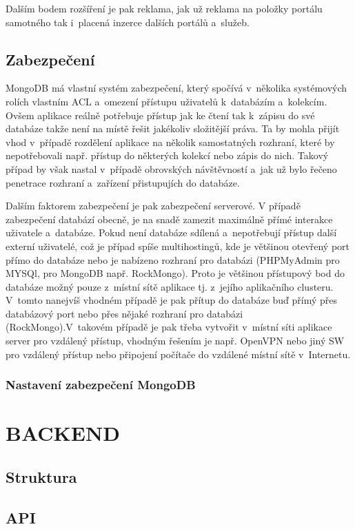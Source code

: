 \documentclass[a4paper,12pt,twoside,BCOR=10mm]{article}
\newcommand{\upc}[1]{\uppercase{#1}} %
\begin{document}
Dalším bodem rozšíření je pak reklama, jak už reklama na položky portálu samotného tak i~placená inzerce dalších portálů a~služeb.

\subsection{Zabezpečení}
MongoDB má vlastní systém zabezpečení, který spočívá v~několika systémových rolích vlastním ACL a~omezení přístupu uživatelů k~databázím a~kolekcím. Ovšem aplikace reálně potřebuje přístup jak ke čtení tak k~zápisu do své databáze takže není na místě řešit jakékoliv složitější práva. Ta by mohla přijít vhod v~případě rozdělení aplikace na několik samostatných rozhraní, které by nepotřebovali např. přístup do některých kolekcí nebo zápis do nich. Takový případ by však nastal v~případě obrovských návštěvností a~jak už bylo řečeno penetrace rozhraní a~zařízení přistupujích do databáze.

Dalším faktorem zabezpečení je pak zabezpečení serverové. V případě zabezpečení databází obecně, je na snadě zamezit maximálně přímé interakce uživatele a~databáze. Pokud není databáze sdílená a~nepotřebují přístup další externí uživatelé, což je případ spíše multihostingů, kde je většinou otevřený port přímo do databáze nebo je nabízeno rozhraní pro databázi (PHPMyAdmin pro MYSQl, pro MongoDB např. RockMongo). Proto je většinou přístupový bod do databáze možný pouze z~místní sítě aplikace tj. z~jejího aplikačního clusteru. V~tomto nanejvíš vhodném případě je pak přítup do databáze buď přímý přes databázový port nebo přes nějaké rozhraní pro databázi (RockMongo).V~takovém případě je pak třeba vytvořit v~místní síti aplikace server pro vzdálený přístup, vhodným řešením je např. OpenVPN nebo jiný SW pro vzdálený přístup nebo připojení počítače do vzdálené místní sítě v~Internetu.

\subsubsection{Nastavení zabezpečení MongoDB}

\section{\upc{Backend}}\label{sec:backend}
\subsection{Struktura}
\subsection{API}
\end{document}
